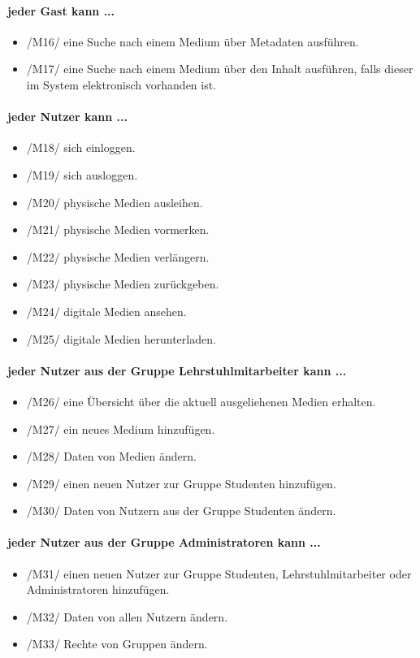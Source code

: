 \documentclass[12pt, a4paper]{article}
\begin{document}
\paragraph{jeder Gast kann ...}
\begin{itemize}
	\item /M16/ eine Suche nach einem Medium über Metadaten ausführen.
	\item /M17/ eine Suche nach einem Medium über den Inhalt ausführen, falls  dieser im System elektronisch vorhanden ist.
\end{itemize}
\paragraph{jeder Nutzer kann ...}
\begin{itemize}
	\item /M18/ sich einloggen.
	\item /M19/ sich ausloggen.
	\item /M20/ physische Medien ausleihen.
	\item /M21/ physische Medien vormerken.
	\item /M22/ physische Medien verlängern.
	\item /M23/ physische Medien zurückgeben.
	\item /M24/ digitale Medien ansehen.
	\item /M25/ digitale Medien herunterladen.
\end{itemize}
\paragraph{jeder Nutzer aus der Gruppe Lehrstuhlmitarbeiter kann ...}
\begin{itemize}
	\item /M26/ eine Übersicht über die aktuell ausgeliehenen Medien erhalten.
	\item /M27/ ein neues Medium hinzufügen.
	\item /M28/ Daten von Medien ändern.
	\item /M29/ einen neuen Nutzer zur Gruppe Studenten hinzufügen.
	\item /M30/ Daten von Nutzern aus der Gruppe Studenten ändern.
\end{itemize}
\paragraph{jeder Nutzer aus der Gruppe Administratoren kann ...}
\begin{itemize}
	\item /M31/ einen neuen Nutzer zur Gruppe Studenten, Lehrstuhlmitarbeiter oder Administratoren hinzufügen.
	\item /M32/ Daten von allen Nutzern ändern.
	\item /M33/ Rechte von Gruppen ändern.
\end{itemize}
\end{document}
